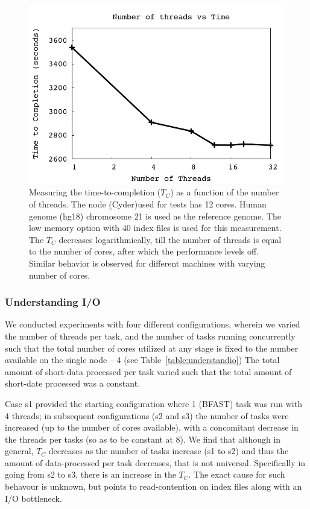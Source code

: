 \documentclass{sig-alternate}
\begin{document}
 \begin{figure}
 \centering
\includegraphics[scale=0.66]{figures/threadsvstime.pdf} 

\caption{\small Measuring the time-to-completion ($T_C$) as a function of the
  number of threads.  The node (Cyder)used for tests has 12 cores.  Human
  genome (hg18) chromosome 21 is used as the reference genome. The low
  memory option with 40 index files is used for this measurement. The
  $T_C$ decreases logarithmically, till the number of
  threads is equal to the number of cores, after which the performance
  levels off. Similar behavior is observed for different machines
  with varying number of cores.}
  \label{fig:threading-benchmark} 
 \end{figure}

\subsubsection{Understanding I/O}

We conducted experiments with four different configurations, wherein
we varied the number of threads per task, and the number of tasks
running concurrently such that the total number of cores utilized at
any stage is fixed to the number available on the single node -- 4
(see Table~\ref{table:understandio}) The total amount of short-data
processed per task varied such that the total amount of short-date
processed was a constant.

Case s1 provided the starting configuration where 1 (BFAST) task was
run with 4 threads; in subsequent configurations (s2 and s3) the
number of tasks were increased (up to the number of cores available),
with a concomitant decrease in the threads per tasks (so as to be
constant at 8). We find that although in general, $T_C$ decreases as
the number of tasks increase (s1 to s2) and thus the amount of
data-processed per task decreases, that is not universal. Specifically
in going from s2 to s3, there is an increase in the $T_C$.  The exact
cause for such behavour is unknown, but points to read-contention on
index files along with an I/O bottleneck.
\end{document}
